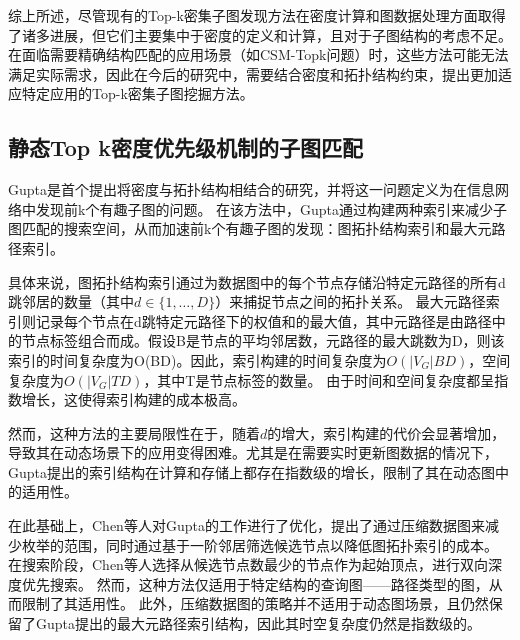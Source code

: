 综上所述，尽管现有的Top-k密集子图发现方法在密度计算和图数据处理方面取得了诸多进展，但它们主要集中于密度的定义和计算，且对于子图结构的考虑不足。在面临需要精确结构匹配的应用场景（如CSM-Topk问题）时，这些方法可能无法满足实际需求，因此在今后的研究中，需要结合密度和拓扑结构约束，提出更加适应特定应用的Top-k密集子图挖掘方法。

\subsection{静态Top k密度优先级机制的子图匹配}
Gupta\cite{static-topk-Gupta-DBLP:conf/icde/GuptaGYCH14}是首个提出将密度与拓扑结构相结合的研究，并将这一问题定义为在信息网络中发现前k个有趣子图的问题。
在该方法中，Gupta\cite{static-topk-Gupta-DBLP:conf/icde/GuptaGYCH14}通过构建两种索引来减少子图匹配的搜索空间，从而加速前k个有趣子图的发现：图拓扑结构索引和最大元路径索引。

具体来说，图拓扑结构索引通过为数据图中的每个节点存储沿特定元路径的所有d跳邻居的数量（其中$d \in \{1,\dots,D\}$）来捕捉节点之间的拓扑关系。
最大元路径索引则记录每个节点在d跳特定元路径下的权值和的最大值，其中元路径是由路径中的节点标签组合而成。假设B是节点的平均邻居数，元路径的最大跳数为D，则该索引的时间复杂度为O(BD)。因此，索引构建的时间复杂度为$O(|V_G|BD)$，空间复杂度为$O(|V_G|TD)$，其中T是节点标签的数量。
由于时间和空间复杂度都呈指数增长，这使得索引构建的成本极高。

然而，这种方法的主要局限性在于，随着$d$的增大，索引构建的代价会显著增加，导致其在动态场景下的应用变得困难。尤其是在需要实时更新图数据的情况下，Gupta提出的索引结构在计算和存储上都存在指数级的增长，限制了其在动态图中的适用性。


在此基础上，Chen\cite{static-topk-Chen-DBLP:journals/ijprai/ChenLCTL18}等人对Gupta的工作进行了优化，提出了通过压缩数据图来减少枚举的范围，同时通过基于一阶邻居筛选候选节点以降低图拓扑索引的成本。
在搜索阶段，Chen\cite{static-topk-Chen-DBLP:journals/ijprai/ChenLCTL18}等人选择从候选节点数最少的节点作为起始顶点，进行双向深度优先搜索。
然而，这种方法仅适用于特定结构的查询图——路径类型的图，从而限制了其适用性。
此外，压缩数据图的策略并不适用于动态图场景，且仍然保留了Gupta提出的最大元路径索引结构，因此其时空复杂度仍然是指数级的。

